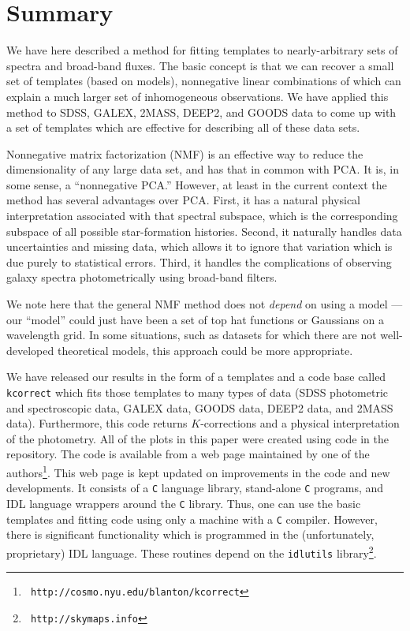\documentclass[12pt,preprint]{aastex}
\begin{document}
\section{Summary}
\label{summary}

We have here described a method for fitting templates to
nearly-arbitrary sets of spectra and broad-band fluxes. The basic
concept is that we can recover a small set of templates (based on
models), nonnegative linear combinations of which can explain a much
larger set of inhomogeneous observations.  We have applied this method
to SDSS, GALEX, 2MASS, DEEP2, and GOODS data to come up with a set of
templates which are effective for describing all of these data sets.

Nonnegative matrix factorization (NMF) is an effective way to reduce
the dimensionality of any large data set, and has that in common with
PCA.  It is, in some sense, a ``nonnegative PCA.''  However, at least
in the current context the method has several advantages over
PCA. First, it has a natural physical interpretation associated with
that spectral subspace, which is the corresponding subspace of all
possible star-formation histories. Second, it naturally handles data
uncertainties and missing data, which allows it to ignore that
variation which is due purely to statistical errors.  Third, it
handles the complications of observing galaxy spectra photometrically
using broad-band filters. 

We note here that the general NMF method does not {\it depend} on
using a model --- our ``model'' could just have been a set of top hat
functions or Gaussians on a wavelength grid. In some situations, such
as datasets for which there are not well-developed theoretical models,
this approach could be more appropriate.

We have released our results in the form of a templates and a code
base called {\tt kcorrect} which fits those templates to many types of
data (SDSS photometric and spectroscopic data, GALEX data, GOODS data,
DEEP2 data, and 2MASS data). Furthermore, this code returns
$K$-corrections and a physical interpretation of the photometry. All
of the plots in this paper were created using code in the
repository. The code is available from a web page maintained by one of
the authors\footnote{{\tt
http://cosmo.nyu.edu/blanton/kcorrect}}. This web page is kept updated
on improvements in the code and new developments. It consists of a
{\tt C} language library, stand-alone {\tt C} programs, and IDL
language wrappers around the {\tt C} library. Thus, one can use the
basic templates and fitting code using only a machine with a {\tt C}
compiler. However, there is significant functionality which is
programmed in the (unfortunately, proprietary) IDL language. These
routines depend on the {\tt idlutils} library\footnote{{\tt
http://skymaps.info}}.
\end{document}
